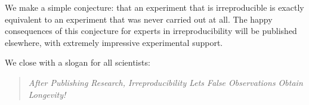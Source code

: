 \documentclass[a4paper,11pt]{article}
\begin{document}
We make a simple conjecture: {that an experiment that
is irreproducible is exactly equivalent to an experiment that was
never carried out at all}. The happy consequences of this conjecture
for experts in irreproducibility will be published elsewhere, with extremely impressive experimental support. 

We close with a slogan for all scientists:
\begin{quote}
\emph{After
Publishing
Research,
Irreproducibility 
Lets
False
Observations
Obtain
Longevity!}
\end{quote}














\end{document}
